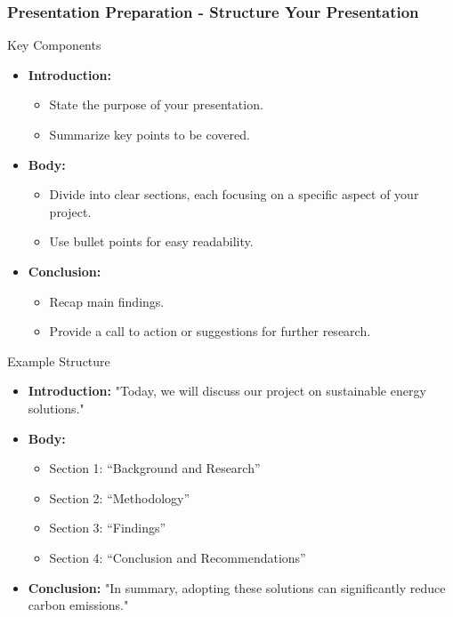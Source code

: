 \documentclass[aspectratio=169]{beamer}
\begin{document}
\begin{frame}[fragile]
    \frametitle{Presentation Preparation - Structure Your Presentation}
    \begin{block}{Key Components}
        \begin{itemize}
            \item \textbf{Introduction:} 
                \begin{itemize}
                    \item State the purpose of your presentation.
                    \item Summarize key points to be covered.
                \end{itemize}
            \item \textbf{Body:}
                \begin{itemize}
                    \item Divide into clear sections, each focusing on a specific aspect of your project.
                    \item Use bullet points for easy readability.
                \end{itemize}
            \item \textbf{Conclusion:}
                \begin{itemize}
                    \item Recap main findings.
                    \item Provide a call to action or suggestions for further research.
                \end{itemize}
        \end{itemize}
    \end{block}
    
    \begin{block}{Example Structure}
        \begin{itemize}
            \item \textbf{Introduction:} "Today, we will discuss our project on sustainable energy solutions."
            \item \textbf{Body:} 
                \begin{itemize}
                    \item Section 1: “Background and Research”
                    \item Section 2: “Methodology”
                    \item Section 3: “Findings”
                    \item Section 4: “Conclusion and Recommendations”
                \end{itemize}
            \item \textbf{Conclusion:} "In summary, adopting these solutions can significantly reduce carbon emissions."
        \end{itemize}
    \end{block}
\end{frame}
\end{document}
